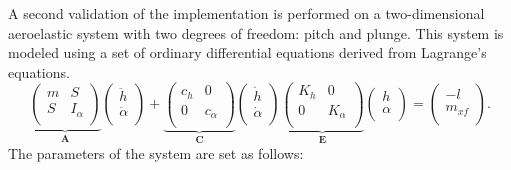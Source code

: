 \documentclass[a4paper,12pt]{article}
\begin{document}
A second validation of the implementation is performed on a two-dimensional aeroelastic system with two degrees of freedom: pitch and plunge.
This system is modeled using a set of ordinary differential equations derived from Lagrange's equations.
\begin{equation}
  \underbrace{\left(\begin{array}{ccc}
    m & S \\
    S & I_\alpha \\
    \end{array} \right)}_{\boldsymbol{A}}\left(\begin{array}{c}
    \ddot{h} \\
    \ddot{\alpha} \\
    \end{array}\right)+\underbrace{\left(\begin{array}{ccc}
      c_h & 0  \\
      0 & c_\alpha \\
      \end{array}\right)}_{\boldsymbol{C}}\left(\begin{array}{l}
      \dot{h} \\
      \dot{\alpha} \\
      \end{array}\right)\underbrace{\left(\begin{array}{ccc}
    K_h & 0 \\
    0 & K_\alpha \\
    \end{array}\right)}_{\boldsymbol{E}}\left(\begin{array}{l}
    h \\
    \alpha \\
    \end{array}\right)=\left(\begin{array}{c}
    -l \\
    m_{x f} \\
    \end{array}\right).
\label{eq:system}
\end{equation}
The parameters of the system are set as follows:
\end{document}
